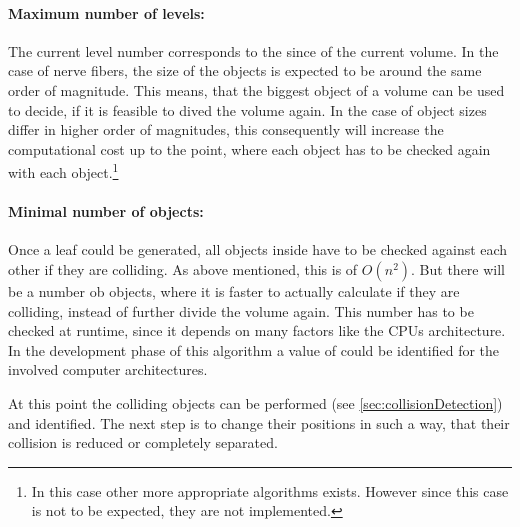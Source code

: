\paragraph{Maximum number of levels:}
The current level number corresponds to the since of the current volume.
In the case of nerve fibers, the size of the objects is expected to be around the same order of magnitude.
This means, that the biggest object of a volume can be used to decide, if it is feasible to dived the volume again.
In the case of object sizes differ in higher order of magnitudes, this consequently will increase the computational cost up to the point, where each object has to be checked again with each object.\footnote{In this case other more appropriate algorithms exists. However since this case is not to be expected, they are not implemented.}
% 
\paragraph{Minimal number of objects:}
Once a leaf could be generated, all objects inside have to be checked against each other if they are colliding.
As above mentioned, this is of $O(n^2)$.
But there will be a number ob objects, where it is faster to actually calculate if they are colliding, instead of further divide the volume again.
This number has to be checked at runtime, since it depends on many factors like the CPUs architecture.
In the development phase of this algorithm a value of  could be identified for the involved computer architectures.
\par
% 
At this point the colliding objects can be performed (see \cref{sec:collisionDetection}) and identified.
The next step is to change their positions in such a way, that their collision is reduced or completely separated.
%
